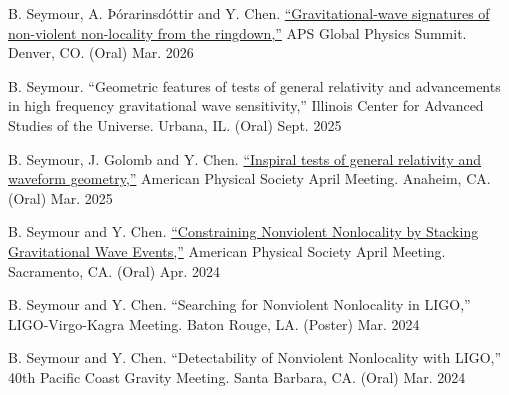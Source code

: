 

\begin{cvpresentationsmod}

      \cvpresentation
      {B. Seymour, A. Þórarinsdóttir and Y. Chen. \href{https://meetings-archive.aps.org/smt/2026/apr-g94/9/}{``Gravitational-wave signatures of non-violent non-locality from the ringdown,''} APS Global Physics Summit. Denver, CO. (Oral)}
      {Mar. 2026}

    
        \cvpresentation
        {B. Seymour. “Geometric features of tests of general relativity and advancements in high frequency gravitational wave sensitivity,” Illinois Center for Advanced Studies of the Universe. Urbana, IL. (Oral)}
        {Sept. 2025}


      \cvpresentation
      {B. Seymour, J. Golomb and Y. Chen. \href{https://meetings-archive.aps.org/smt/2025/apr-s18/1/}{“Inspiral tests of general relativity and waveform geometry,”} American Physical Society April Meeting. Anaheim, CA. (Oral)}
      {Mar. 2025}


    \cvpresentation
    {B. Seymour and Y. Chen. \href{https://meetings.aps.org/Meeting/APR24/Session/H17.7}{“Constraining Nonviolent Nonlocality by Stacking Gravitational Wave Events,”} American Physical Society April Meeting. Sacramento, CA. (Oral)}
    {Apr. 2024}
    

    \cvpresentation
    {B. Seymour and Y. Chen. “Searching for Nonviolent Nonlocality in LIGO,” LIGO-Virgo-Kagra Meeting. Baton Rouge, LA. (Poster)}
    {Mar. 2024}
    

    \cvpresentation
    {B. Seymour and Y. Chen. “Detectability of Nonviolent Nonlocality with LIGO,” 40th Pacific Coast Gravity Meeting. Santa Barbara, CA. (Oral)}
    {Mar. 2024}


\end{cvpresentationsmod}

